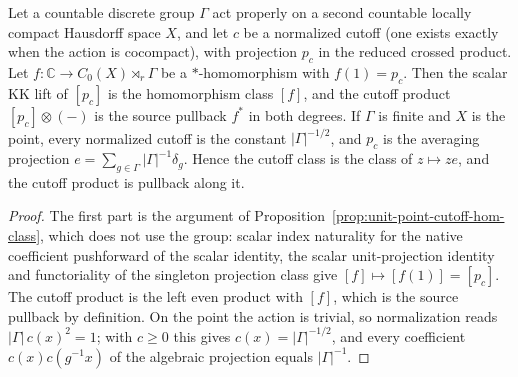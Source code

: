 \begin{proposition}\label{prop:finite-point-cutoff-averaging}
\leanok
Let a countable discrete group $\Gamma$ act properly on a second countable
locally compact Hausdorff space $X$, and let $c$ be a normalized cutoff (one
exists exactly when the action is cocompact), with projection
$p_c$ in the reduced crossed product. Let $f\colon\mathbb C\to
C_0(X)\rtimes_r\Gamma$ be a $*$-homomorphism with $f(1)=p_c$. Then the scalar
KK lift of $[p_c]$ is the homomorphism class $[f]$, and the cutoff product
$[p_c]\otimes(-)$ is the source pullback $f^*$ in both degrees.
If $\Gamma$ is finite and $X$ is the point, every normalized cutoff is the
constant $|\Gamma|^{-1/2}$, and $p_c$ is the averaging projection
$e=\sum_{g\in\Gamma}|\Gamma|^{-1}\delta_g$. Hence the cutoff class is the
class of $z\mapsto ze$, and the cutoff product is pullback along it.
\end{proposition}
\begin{proof}
\leanok
The first part is the argument of
Proposition~\ref{prop:unit-point-cutoff-hom-class}, which does not use the
group: scalar index naturality for the native coefficient pushforward of the
scalar identity, the scalar unit-projection identity and functoriality of the
singleton projection class give $[f]\mapsto[f(1)]=[p_c]$. The cutoff product
is the left even product with $[f]$, which is the source pullback by
definition. On the point the action is trivial, so normalization reads
$|\Gamma|\,c(x)^2=1$; with $c\ge0$ this gives $c(x)=|\Gamma|^{-1/2}$, and
every coefficient $c(x)c(g^{-1}x)$ of the algebraic projection equals
$|\Gamma|^{-1}$.
\end{proof}

